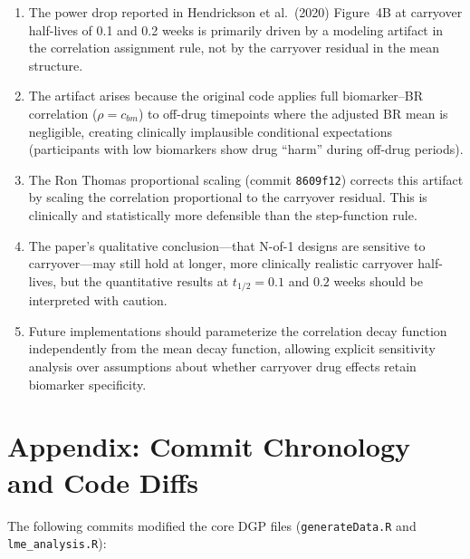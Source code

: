 \documentclass[11pt]{article}
\begin{document}
\begin{enumerate}
\item The power drop reported in Hendrickson et al.\ (2020)
  Figure~4B at carryover half-lives of 0.1 and 0.2 weeks is
  primarily driven by a modeling artifact in the correlation
  assignment rule, not by the carryover residual in the mean
  structure.

\item The artifact arises because the original code applies
  full biomarker--BR correlation ($\rho = c_{bm}$) to
  off-drug timepoints where the adjusted BR mean is
  negligible, creating clinically implausible conditional
  expectations (participants with low biomarkers show drug
  ``harm'' during off-drug periods).

\item The Ron Thomas proportional scaling (commit
  \texttt{8609f12}) corrects this artifact by scaling the
  correlation proportional to the carryover residual. This
  is clinically and statistically more defensible than the
  step-function rule.

\item The paper's qualitative conclusion---that N-of-1
  designs are sensitive to carryover---may still hold at
  longer, more clinically realistic carryover half-lives,
  but the quantitative results at $t_{1/2} = 0.1$ and
  $0.2$ weeks should be interpreted with caution.

\item Future implementations should parameterize the
  correlation decay function independently from the mean
  decay function, allowing explicit sensitivity analysis
  over assumptions about whether carryover drug effects
  retain biomarker specificity.
\end{enumerate}

\section*{Appendix: Commit Chronology and Code Diffs}

The following commits modified the core DGP files
(\texttt{generateData.R} and \texttt{lme\_analysis.R}):
\end{document}
